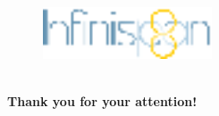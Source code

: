 \documentclass[10pt,utf8]{beamer}
\begin{document}
\begin{frame}
	\begin{figure}
		\centering
		\includegraphics[width=5cm]{./img/infinispan8.eps}
	\end{figure}
	\centering
	\large{} \\
	\vspace{1cm}
	\huge{\textbf{Thank you for your attention!}} \\
\end{frame}
\end{document}
